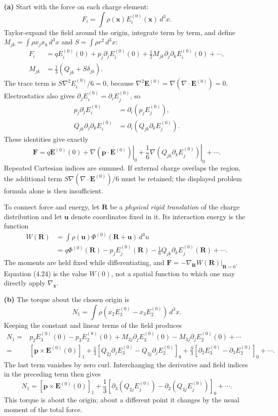 \textbf{(a)} Start with the force on each charge element:
\[
F_i=\int\rho(\mathbf x)E_i^{(0)}(\mathbf x)\,d^3x.
\]
Taylor-expand the field around the origin, integrate term by term,
and define $M_{jk}=\int\rho x_jx_k\,d^3x$ and
$S=\int\rho r^2\,d^3x$:
\begin{align*}
F_i&=qE_i^{(0)}(0)+p_j\partial_jE_i^{(0)}(0)
+\frac12M_{jk}\partial_j\partial_kE_i^{(0)}(0)+\cdots,\\
M_{jk}&=\frac13(Q_{jk}+S\delta_{jk}).
\end{align*}
The trace term is $S\nabla^2E_i^{(0)}/6=0$, because
$\nabla^2\mathbf E^{(0)}=\nabla(\nabla\cdot\mathbf E^{(0)})=0$.
Electrostatics also gives $\partial_jE_i^{(0)}=\partial_iE_j^{(0)}$,
so
\begin{align*}
p_j\partial_jE_i^{(0)}&=\partial_i(p_jE_j^{(0)}),\\
Q_{jk}\partial_j\partial_kE_i^{(0)}
&=\partial_i(Q_{jk}\partial_kE_j^{(0)}).
\end{align*}
These identities give exactly
\[
\boxed{\mathbf F=q\mathbf E^{(0)}(0)
+\left.\nabla(\mathbf p\cdot\mathbf E^{(0)})\right|_0
+\left.\frac16\nabla(Q_{jk}\partial_kE_j^{(0)})\right|_0+\cdots.}
\]
Repeated Cartesian indices are summed. If external charge overlaps the
region, the additional term $S\nabla(\nabla\cdot\mathbf E^{(0)})/6$
must be retained; the displayed problem formula alone is then insufficient.

To connect force and energy, let $\mathbf R$ be a \emph{physical rigid
translation} of the charge distribution and let $\mathbf u$ denote
coordinates fixed in it. Its interaction energy is the function
\begin{align*}
W(\mathbf R)&=\int\rho(\mathbf u)\Phi^{(0)}(\mathbf R+\mathbf u)\,d^3u\\
&=q\Phi^{(0)}(\mathbf R)-p_jE_j^{(0)}(\mathbf R)
-\frac16Q_{jk}\partial_kE_j^{(0)}(\mathbf R)+\cdots.
\end{align*}
The moments are held fixed while differentiating, and
$\mathbf F=-\nabla_{\mathbf R}W(\mathbf R)|_{\mathbf R=0}$.
Equation (4.24) is the value $W(0)$, not a spatial function to which
one may directly apply $\nabla_{\mathbf x}$.

\textbf{(b)} The torque about the chosen origin is
\[
N_1=\int\rho(x_2E_3^{(0)}-x_3E_2^{(0)})\,d^3x.
\]
Keeping the constant and linear terms of the field produces
\begin{align*}
N_1={}&p_2E_3^{(0)}(0)-p_3E_2^{(0)}(0)
+M_{2j}\partial_jE_3^{(0)}(0)-M_{3j}\partial_jE_2^{(0)}(0)+\cdots\\
={}&[\mathbf p\times\mathbf E^{(0)}(0)]_1
+\frac13[Q_{2j}\partial_jE_3^{(0)}-Q_{3j}\partial_jE_2^{(0)}]_0
+\frac S3[\partial_2E_3^{(0)}-\partial_3E_2^{(0)}]_0+\cdots.
\end{align*}
The last term vanishes by zero curl. Interchanging the derivative and
field indices in the preceding term then gives
\[
\boxed{N_1=[\mathbf p\times\mathbf E^{(0)}(0)]_1
+\frac13[\partial_3(Q_{2j}E_j^{(0)})
-\partial_2(Q_{3j}E_j^{(0)})]_0+\cdots.}
\]
This torque is about the origin; about a different point it changes by
the usual moment of the total force.

